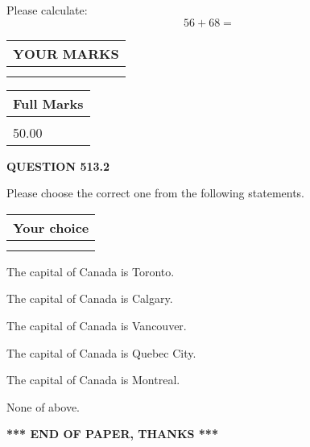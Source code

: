 \documentclass[12pt]{article}
\begin{document}
  
 
Please calculate:
\begin{equation}
56 +  %
68 = \nonumber
\end{equation}
 

 

 
  
\vspace{0.2in}
  
\noindent\begin{tabular}{|l|}
\hline
 YOUR MARKS  \\
\hline
 \\ 
 \\ 
\hline
\end{tabular}
\hspace{0.05in} \begin{tabular}{|l|}
\hline
 Full Marks  \\
\hline
 \\ 
50.00 \\
\hline
\end{tabular}
{\textbf{\Large{QUESTION
513.2 
}}}
  
  
Please choose the correct one from the following statements.
  
  
\noindent\hspace{3.0in} \begin{tabular}{|l|}
\hline
Your choice \\
\hline
 \\ 
 \\ 
\hline
\end{tabular}
  
  
 
 
The capital of Canada is Toronto.
 
 
The capital of Canada is Calgary.
 
 
The capital of Canada is Vancouver.
 
 
The capital of Canada is Quebec City.
 
 
The capital of Canada is Montreal.
 
 
 None of above.
 
 
   
   
 \vspace{0.2in}
 
   
   
   
   
\vspace{1.0in} 
{\textbf{\large{ *** END OF PAPER, THANKS *** }}} 
   
\end{document}
